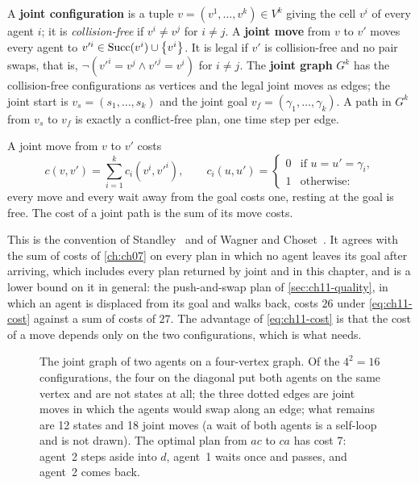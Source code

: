 \begin{definition}
\label{def:ch11-joint}
A \textbf{joint configuration} is a tuple
$v = (v^1, \dots, v^k) \in V^k$ giving the cell $v^i$ of every agent $i$; it
is \emph{collision-free} if $v^i \ne v^j$ for $i \ne j$. A \textbf{joint
move} from $v$ to $v'$ moves every agent to $v'^i \in \operatorname{Succ}(v^i) \cup
\left\{ v^i \right\}$. It is legal if $v'$ is collision-free and no pair swaps, that
is, $\neg(v'^i = v^j \wedge v'^j = v^i)$ for $i \ne j$. The \textbf{joint
graph} $G^k$ has the collision-free configurations
as vertices and the legal joint moves as edges; the joint start is
$v_s = (s_1, \dots, s_k)$ and the joint goal $v_f = (\gamma_1, \dots,
\gamma_k)$. A path in $G^k$ from $v_s$ to $v_f$ is exactly a conflict-free
plan, one time step per edge.
\end{definition}

\begin{definition}
\label{def:ch11-cost}
A joint move from $v$ to $v'$ costs
\begin{equation}
  c(v, v') = \sum_{i=1}^{k} c_i(v^i, v'^i), \qquad
  c_i(u, u') = \begin{cases} 0 & \text{if } u = u' = \gamma_i,\\ 1 & \text{otherwise:}\end{cases}
  \label{eq:ch11-cost}
\end{equation}
every move and every wait away from the goal costs one, resting at the goal
is free. The cost of a joint path is the sum of its move costs.
\end{definition}

This is the convention of Standley~\cite{standley2010finding} and of Wagner
and Choset~\cite{wagner2011mstar}. It agrees with the sum of costs of
\cref{ch:ch07} on every plan in which no agent leaves its goal after
arriving, which includes every plan returned by joint \astar and \mstar in
this chapter, and is a lower bound on it in general: the push-and-swap plan
of \cref{sec:ch11-quality}, in which an agent is displaced from its goal and
walks back, costs $26$ under \cref{eq:ch11-cost} against a sum of costs of
$27$. The advantage of \cref{eq:ch11-cost} is that the cost of a move
depends only on the two configurations, which is what \astar needs.

\begin{figure}[!tb]
  \centering
  \caption{The joint graph of two agents on a four-vertex graph. Of the
  $4^2 = 16$ configurations, the four on the diagonal put both agents on the
  same vertex and are not states at all; the three dotted edges are joint
  moves in which the agents would swap along an edge; what remains are 12
  states and 18 joint moves (a wait of both agents is a self-loop and is not
  drawn). The optimal plan from $ac$ to $ca$ has cost 7: agent~2 steps aside
  into $d$, agent~1 waits once and passes, and agent~2 comes back.}
  \label{fig:ch11-joint-graph}
\end{figure}

